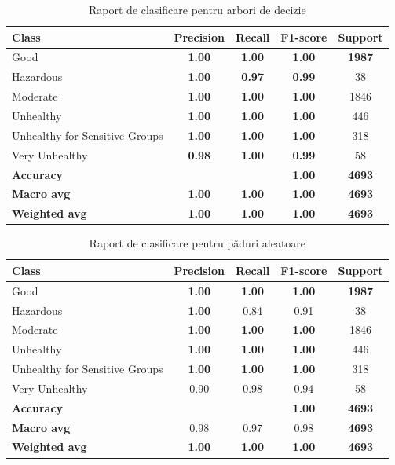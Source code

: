 \documentclass{article}
\begin{document}
\begin{table}[htb]
\centering
\begin{tabular}{lcccc}
\toprule
\textbf{Class} & \textbf{Precision} & \textbf{Recall} & \textbf{F1-score} & \textbf{Support} \\
\midrule
Good                             & \textbf{1.00} & \textbf{1.00} & \textbf{1.00} & \textbf{1987} \\
Hazardous                        & \textbf{1.00} & \textbf{0.97} & \textbf{0.99} & 38   \\
Moderate                         & \textbf{1.00} & \textbf{1.00} & \textbf{1.00} & 1846 \\
Unhealthy                        & \textbf{1.00} & \textbf{1.00} & \textbf{1.00} & 446  \\
Unhealthy for Sensitive Groups  & \textbf{1.00} & \textbf{1.00} & \textbf{1.00} & 318  \\
Very Unhealthy                   & \textbf{0.98} & \textbf{1.00} & \textbf{0.99} & 58   \\
\midrule
\textbf{Accuracy}               &       &       & \textbf{1.00} & \textbf{4693} \\
\textbf{Macro avg}              & \textbf{1.00} & \textbf{1.00} & \textbf{1.00} & \textbf{4693} \\
\textbf{Weighted avg}           & \textbf{1.00} & \textbf{1.00} & \textbf{1.00} & \textbf{4693} \\
\end{tabular}
\caption{Raport de clasificare pentru arbori de decizie}
\end{table}

\begin{table}[htb]
\centering
\begin{tabular}{lcccc}
\hline
\textbf{Class} & \textbf{Precision} & \textbf{Recall} & \textbf{F1-score} & \textbf{Support} \\
\hline
Good                               & \textbf{1.00} & \textbf{1.00} & \textbf{1.00} & \textbf{1987} \\
Hazardous                          & \textbf{1.00} & 0.84 & 0.91 & 38   \\
Moderate                           & \textbf{1.00} & \textbf{1.00} & \textbf{1.00} & 1846 \\
Unhealthy                          & \textbf{1.00} & \textbf{1.00} & \textbf{1.00} & 446  \\
Unhealthy for Sensitive Groups     & \textbf{1.00} & \textbf{1.00} & \textbf{1.00} & 318  \\
Very Unhealthy                     & 0.90 & 0.98 & 0.94 & 58   \\
\hline
\textbf{Accuracy}                 &      &      & \textbf{1.00} & \textbf{4693} \\
\textbf{Macro avg}                & 0.98 & 0.97 & 0.98 & \textbf{4693} \\
\textbf{Weighted avg}             & \textbf{1.00} & \textbf{1.00} & \textbf{1.00} & \textbf{4693} \\
\hline
\end{tabular}
\caption{Raport de clasificare pentru păduri aleatoare}
\end{table}
\end{document}
